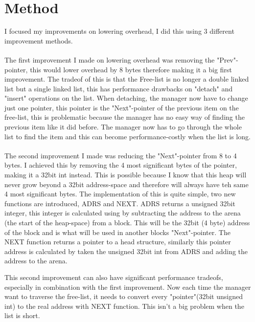 \documentclass[11pt]{article}
\begin{document}
\section{Method}

I focused my improvements on lowering overhead, I did this using 3 different improvement methods.

\paragraph{}
The first improvement I made on lowering overhead was removing the "Prev"-pointer, this would lower overhead by 8 bytes therefore making it a big
first improvement. The tradeof of this is that the Free-list is no longer a double linked list but a single linked list, this has performance
drawbacks on "detach" and "insert" operations on the list. When detaching, the manager now have to change just one pointer, this pointer is the 
"Next"-pointer of the previous item on the free-list, this is problematic because the manager has no easy way of finding the previous item like
it did before. The manager now has to go through the whole list to find the item and this can become performance-costly when the list is long.

\paragraph{}
The second improvement I made was reducing the "Next"-pointer from 8 to 4 bytes. I achieved this by removing the 4 most significant bytes
of the pointer, making it a 32bit int instead. This is possible because I know that this heap will never grow beyond a 32bit address-space
and therefore will always have teh same 4 most significant bytes. The implementation of this is quite simple, two new functions are 
introduced, ADRS and NEXT. ADRS returns a unsigned 32bit integer, this integer is calculated using by subtracting the address to the arena
(the start of the heap-space) from a block. This will be the 32bit (4 byte) address of the block and is what will be used in another blocks
"Next"-pointer. The NEXT function returns a pointer to a head structure, similarly this pointer address is calculated by taken the 
unsigned 32bit int from ADRS and adding the address to the arena. 

This second improvement can also have significant performance tradeofs, especially in combination with the first improvement. Now each time
the manager want to traverse the free-list, it needs to convert every "pointer"(32bit unsigned int) to the real address with NEXT function.
This isn't a big problem when the list is short.
\end{document}

